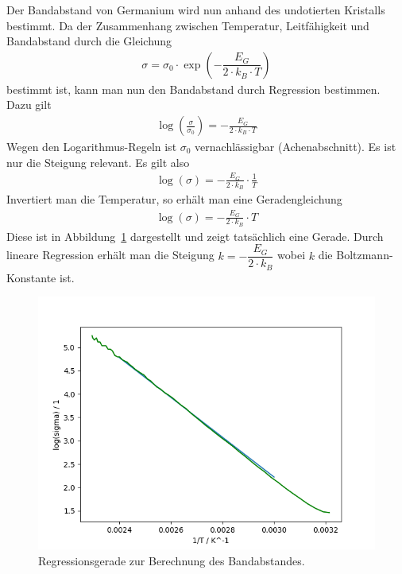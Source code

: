 \documentclass{article}
\begin{document}
Der Bandabstand von Germanium wird nun anhand des undotierten Kristalls bestimmt. Da der Zusammenhang zwischen Temperatur, Leitfähigkeit und Bandabstand durch die Gleichung
\begin{align*}
\sigma = \sigma_0 \cdot \exp\left(- \dfrac{E_G}{2\cdot k_B\cdot T}\right)
\end{align*}
bestimmt ist, kann man nun den Bandabstand durch Regression bestimmen. Dazu gilt
\begin{align*}
\log\left(\frac{\sigma}{\sigma_0}\right) = -\frac{E_G}{2\cdot k_B \cdot T }
\end{align*}
Wegen den Logarithmus-Regeln ist $\sigma_0$ vernachlässigbar (Achenabschnitt). Es ist nur die Steigung relevant. Es gilt also
\begin{align*}
\log(\sigma) = - \frac{E_G}{2\cdot k_B} \cdot \frac{1}{T}
\end{align*}
Invertiert man die Temperatur, so erhält man eine Geradengleichung
\begin{align*}
\log(\sigma) = - \frac{E_G}{2\cdot k_B} \cdot T
\end{align*}
Diese ist in Abbildung~\ref{fig:regression} dargestellt und zeigt tatsächlich eine Gerade. Durch lineare Regression erhält man die Steigung $k=-\dfrac{E_G}{2\cdot k_B}$ wobei $k$ die Boltzmann-Konstante ist.


\begin{figure}[H]
\includegraphics[scale=1.]{regression.png}
\caption{Regressionsgerade zur Berechnung des Bandabstandes.}
\label{fig:regression}
\end{figure}
\end{document}
